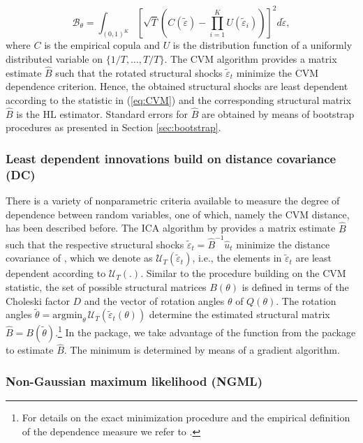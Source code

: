 \documentclass[nojss]{jss}\usepackage[]{graphicx}\usepackage[]{color}
\begin{document}
\begin{equation}\label{eq:CVM}
\mathcal{B}_\theta = \int_{(0,1)^K}\left[\sqrt{T}\left(C(\tilde{\varepsilon}) - \prod^K_{i = 1}U(\tilde{\varepsilon}_i)\right)\right]^2d\tilde{\varepsilon},
\end{equation}
where $C$ is the empirical copula and $U$ is the distribution function of a uniformly distributed variable on $\{1/T,\ldots,T/T\}$. The CVM algorithm provides a matrix estimate $\widehat{B}$ such that the rotated structural shocks $\tilde{\varepsilon}_t$ minimize the CVM dependence criterion. Hence, the obtained structural shocks are least dependent according to the statistic in (\ref{eq:CVM}) and the corresponding structural matrix $\widehat{B}$ is the HL estimator. Standard errors for $\widehat{B}$ are obtained by means of  bootstrap procedures as presented in Section \ref{sec:bootstrap}.

\subsubsection{Least dependent innovations build on distance covariance (DC)}

There is a variety of nonparametric criteria available to measure the degree of dependence between random variables, one of which, namely the CVM distance, has been described before. The ICA algorithm by \cite{Matteson2017} provides a matrix estimate $\widehat{B}$ such that the respective structural shocks $\tilde{\varepsilon}_t=\widehat{B}^{-1}\widehat{u}_t$ minimize the distance covariance of \cite{Szek07}, which we denote as $\mathcal{U}_T(\tilde{\varepsilon}_t)$, i.e., the elements in $\tilde{\varepsilon}_t$ are least dependent according to $\mathcal{U}_T(.)$. Similar to the procedure building on the CVM statistic, the set of possible structural matrices $B(\theta)$ is defined in terms of the Choleski factor $D$ and the vector of rotation angles $\theta$ of $Q(\theta)$. The rotation angles  $\tilde{\theta}=\text{argmin}_{\theta}\, \mathcal{U}_T(\tilde{\varepsilon}_t(\theta))$ determine the estimated structural matrix $\widehat{B}=B(\tilde{\theta})$.\footnote{For details on the exact minimization procedure and the empirical definition of the dependence measure we refer to \cite{Matteson2017}.} In the  package, we take advantage of the function  from the  package  \citep{steadyICA} to estimate $\widehat{B}$. The minimum is determined by means of a gradient algorithm.


\subsubsection{Non-Gaussian maximum likelihood (NGML)}
\end{document}

